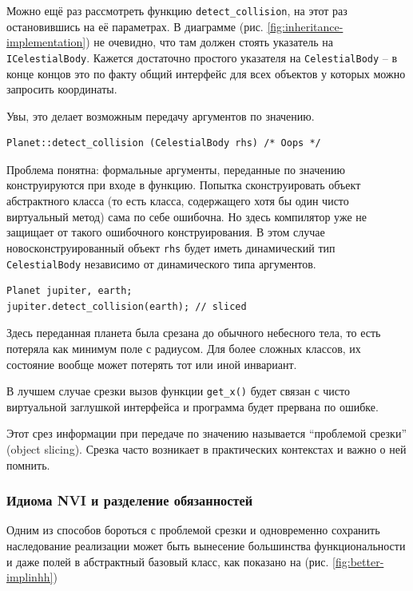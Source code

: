 \documentclass[a4paper,12pt,oneside]{article}
\begin{document}
Можно ещё раз рассмотреть функцию \lstinline!detect_collision!, на этот раз остановившись на её параметрах. В диаграмме (рис. \ref{fig:inheritance-implementation}) не очевидно, что там должен стоять указатель на \lstinline!ICelestialBody!. Кажется достаточно простого указателя на \lstinline!CelestialBody! -- в конце концов это по факту общий интерфейс для всех объектов у которых можно запросить координаты.

Увы, это делает возможным передачу аргументов по значению.

\begin{lstlisting}
Planet::detect_collision (CelestialBody rhs) /* Oops */
\end{lstlisting}

Проблема понятна: формальные аргументы, переданные по значению конструируются при входе в функцию. Попытка сконструировать объект абстрактного класса (то есть класса, содержащего хотя бы один чисто виртуальный метод) сама по себе ошибочна. Но здесь компилятор уже не защищает от такого ошибочного конструирования. В этом случае новосконструированный объект \lstinline!rhs! будет иметь динамический тип \lstinline!CelestialBody! независимо от динамического типа аргументов. 

\begin{lstlisting}
Planet jupiter, earth;
jupiter.detect_collision(earth); // sliced
\end{lstlisting}

Здесь переданная планета была срезана до обычного небесного тела, то есть потеряла как минимум поле с радиусом. Для более сложных классов, их состояние вообще может потерять тот или иной инвариант.

В лучшем случае срезки вызов функции \lstinline!get_x()! будет связан с чисто виртуальной заглушкой интерфейса и программа будет прервана по ошибке. 

Этот срез информации при передаче по значению называется ``проблемой срезки'' (object slicing). Срезка часто возникает в практических контекстах и важно о ней помнить.

\subsubsection{Идиома NVI и разделение обязанностей}\label{NVI}

Одним из способов бороться с проблемой срезки и одновременно сохранить наследование реализации может быть вынесение большинства функциональности и даже полей в абстрактный базовый класс, как показано на (рис. \ref{fig:better-implinhh})
\end{document}
